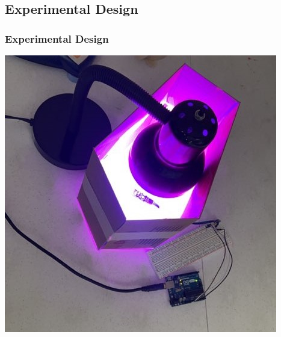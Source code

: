 \documentclass{beamer} %
\begin{document}
\subsection{Experimental Design}
\begin{frame}\centering
  \frametitle{Experimental Design}
  \includegraphics[scale = 0.5]{UVLamp.jpg}
\end{frame}
\end{document}
